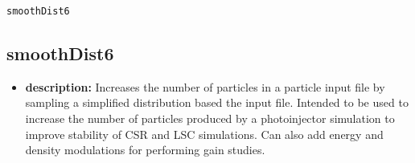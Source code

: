 \documentclass[11pt]{article}
\begin{document}
\newpage
\begin{center}{\Large\verb|smoothDist6|}\end{center}
\subsection{smoothDist6}

\begin{itemize}
\item {\bf description:} Increases the number of particles in a particle input file by
 sampling a simplified distribution based the input file.  Intended to be used to increase the number of particles
 produced by a photoinjector simulation to improve stability of CSR and LSC simulations.
 Can also add energy and density modulations for performing gain studies.


\end{itemize}
\end{document}
